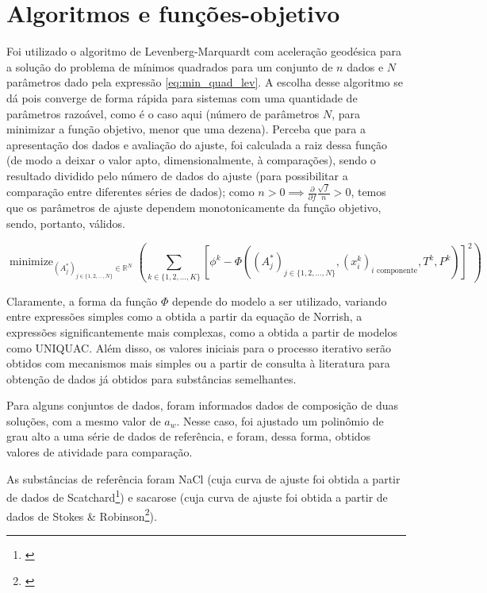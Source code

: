 \documentclass[
	12pt,				%
	openright,
	twoside,
	a4paper,			%
	english,			%
	french,				%
	spanish,			%
	brazil				%
	]{abntex2}
\DeclareMathOperator*{\minimize}{minimize}
\begin{document}
\chapter{Algoritmos e funções-objetivo}

Foi utilizado o algoritmo de Levenberg-Marquardt com aceleração geodésica para a
solução do problema de mínimos quadrados para um conjunto de $n$ dados e $N$
parâmetros dado pela expressão \ref{eq:min_quad_lev}.
A escolha desse algoritmo se dá pois converge de forma rápida para sistemas com
uma quantidade de parâmetros razoável, como é o caso aqui (número de parâmetros
$N$, para minimizar a função objetivo, menor que uma dezena).
Perceba que para a apresentação dos dados e avaliação do ajuste, foi calculada a
raiz dessa função (de modo a deixar o valor apto, dimensionalmente, à comparações),
sendo o resultado dividido pelo número de dados do ajuste (para possibilitar a
comparação entre diferentes séries de dados); como
$n>0 \implies \frac{\partial}{\partial f}\frac{\sqrt{f}}{n} >0$, temos que os
parâmetros de ajuste dependem monotonicamente da função objetivo, sendo, portanto,
válidos.

\begin{equation}
	\label{eq:min_quad_lev}
	\minimize_{(A_j^*)_{j \in \{1,2,\ldots,N\}} \in \mathbb{R}^N}%
	\left(\sum_{k \in \{1,2,\ldots,K\}}\left[\phi^k - \Phi((A^*_j)_{j%
	\in \{1, 2, \ldots, N\}}, (x^k_i)_\text{$i$ componente},%
	T^k, P^k)\right]^2\right)
\end{equation}

Claramente, a forma da função $\Phi$ depende do modelo a ser utilizado, variando
entre expressões simples como a obtida a partir da equação de Norrish, a
expressões significantemente mais complexas, como a obtida a partir de modelos
como UNIQUAC. Além disso, os valores iniciais para o processo iterativo serão
obtidos com mecanismos mais simples ou a partir de consulta à literatura para
obtenção de dados já obtidos para substâncias semelhantes.

Para alguns conjuntos de dados, foram informados dados de composição de duas
soluções, com a mesmo valor de $a_w$. Nesse caso, foi ajustado um polinômio
de grau alto a uma série de dados de referência, e foram, dessa forma, obtidos
valores de atividade para comparação.

As substâncias de referência foram NaCl (cuja curva de ajuste foi obtida a
partir de dados de Scatchard\footnote{\cite{scatchard1938}}) e sacarose (cuja
curva de ajuste foi obtida a partir de dados de Stokes \& Robinson\footnote{%
\cite{stokes1961}}).
\end{document}
